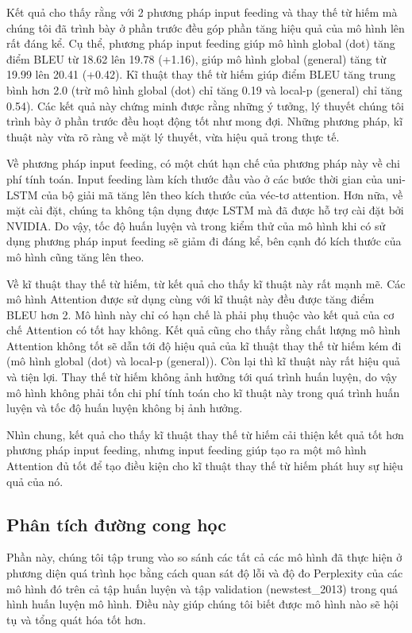 Kết quả cho thấy rằng với 2 phương pháp input feeding và thay thế từ hiếm mà chúng tôi đã trình bày ở phần trước đều góp phần tăng hiệu quả của mô hình lên rất đáng kể. Cụ thể, phương pháp input feeding giúp mô hình global (dot) tăng điểm BLEU từ 18.62 lên 19.78 (+1.16), giúp mô hình global (general) tăng từ 19.99 lên 20.41 (+0.42). Kĩ thuật thay thế từ hiếm giúp điểm BLEU tăng trung bình hơn 2.0 (trừ mô hình global (dot) chỉ tăng 0.19 và local-p (general) chỉ tăng 0.54). Các kết quả này chứng minh được rằng những ý tưởng, lý thuyết chúng tôi trình bày ở phần trước đều hoạt động tốt như mong đợi. Những phương pháp, kĩ thuật này vừa rõ ràng về mặt lý thuyết, vừa hiệu quả trong thực tế.

Về phương pháp input feeding, có một chút hạn chế của phương pháp này về chi phí tính toán. Input feeding làm kích thước đầu vào ở các bước thời gian của uni-LSTM của bộ giải mã tăng lên theo kích thước của véc-tơ attention. Hơn nữa, về mặt cài đặt, chúng ta không tận dụng được LSTM mà đã được hỗ trợ cài đặt bởi NVIDIA. Do vậy, tốc độ huấn luyện và trong kiểm thử của mô hình khi có sử dụng phương pháp input feeding sẽ giảm đi đáng kể, bên cạnh đó kích thước của mô hình cũng tăng lên theo.

Về kĩ thuật thay thế từ hiếm, từ kết quả cho thấy kĩ thuật này rất mạnh mẽ. Các mô hình Attention được sử dụng cùng với kĩ thuật này đều được tăng điểm BLEU hơn 2. Mô hình này chỉ có hạn chế là phải phụ thuộc vào kết quả của cơ chế Attention có tốt hay không. Kết quả cũng cho thấy rằng chất lượng mô hình Attention không tốt sẽ dẫn tới độ hiệu quả của kĩ thuật thay thế từ hiếm kém đi (mô hình global (dot) và local-p (general)). Còn lại thì kĩ thuật này rất hiệu quả và tiện lợi. Thay thế từ hiếm không ảnh hưởng tới quá trình huấn luyện, do vậy mô hình không phải tốn chi phí tính toán cho kĩ thuật này trong quá trình huấn luyện và tốc độ huấn luyện không bị ảnh hưởng. 

Nhìn chung, kết quả cho thấy kĩ thuật thay thế từ hiếm cải thiện kết quả tốt hơn phương pháp input feeding, nhưng input feeding giúp tạo ra một mô hình Attention đủ tốt để tạo điều kiện cho kĩ thuật thay thế từ hiếm phát huy sự hiệu quả của nó.

\subsection{Phân tích đường cong học}
Phần này, chúng tôi tập trung vào so sánh các tất cả các mô hình đã thực hiện ở phương diện quá trình học bằng cách quan sát độ lỗi và độ đo Perplexity của các mô hình đó trên cả tập huấn luyện và tập validation (newstest\_2013) trong quá hình huấn luyện mô hình. Điều này giúp chúng tôi biết được mô hình nào sẽ hội tụ và tổng quát hóa tốt hơn.

